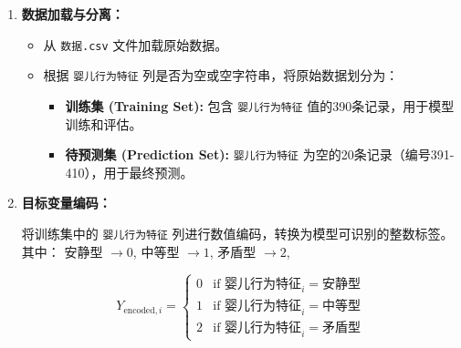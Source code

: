 \documentclass[withoutpreface,bwprint]{cumcmthesis}
\begin{document}
    \begin{enumerate}
        \item \textbf{数据加载与分离：}
        \begin{itemize}
            \item 从 \texttt{数据.csv} 文件加载原始数据。
            \item 根据 \texttt{婴儿行为特征} 列是否为空或空字符串，将原始数据划分为：
            \begin{itemize}
                \item \textbf{训练集 (Training Set):} 包含 \texttt{婴儿行为特征} 值的390条记录，用于模型训练和评估。
                \item \textbf{待预测集 (Prediction Set):} \texttt{婴儿行为特征} 为空的20条记录（编号391-410），用于最终预测。
            \end{itemize}
        \end{itemize}
        \item \textbf{目标变量编码：}

将训练集中的 \texttt{婴儿行为特征} 列进行数值编码，转换为模型可识别的整数标签。其中：       
 安静型 $\to 0$,
 中等型 $\to 1$,
 矛盾型 $\to 2$,



            \[
            Y_{\text{encoded},i} = 
            \begin{cases}
                0 & \text{if 婴儿行为特征}_i = \text{安静型} \\
                1 & \text{if 婴儿行为特征}_i = \text{中等型} \\
                2 & \text{if 婴儿行为特征}_i = \text{矛盾型} 
            \end{cases}
            \]


\end{enumerate}
\end{document}
